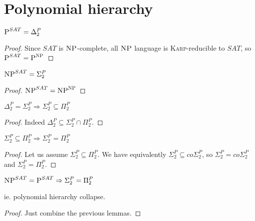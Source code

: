 \section{Polynomial hierarchy}

\begin{lemma}
    $\P^{SAT} = \Delta_2^P$
\end{lemma}
\begin{proof}
    Since $SAT$ is $\NP$-complete, all $\NP$ language is \textsc{Karp}-reducible to $SAT$, so $\P^{SAT} = \P^\NP$
\end{proof}

\begin{lemma}
    $\NP^{SAT} = \Sigma_2^P$
\end{lemma}
\begin{proof}
    $\NP^{SAT} = \NP^\NP$
\end{proof}

\begin{lemma}
    $\Delta_2^P = \Sigma_2^P \Rightarrow \Sigma_2^P \subseteq \Pi_2^P$
\end{lemma}
\begin{proof}
    Indeed $\Delta_2^P \subseteq \Sigma_2^P \cap \Pi_2^P$.
\end{proof}

\begin{lemma}
    $\Sigma_2^P \subseteq \Pi_2^P \Rightarrow \Sigma_2^P = \Pi_2^P$
\end{lemma}
\begin{proof}
    Let us assume $\Sigma_2^P \subseteq \Pi_2^P$. We have equivalently $\Sigma_2^P \subseteq co\Sigma_2^P$, so $\Sigma_2^P = co\Sigma_2^P$ and $\Sigma_2^P = \Pi_2^P$.
\end{proof}

\begin{thm}
    $\NP^{SAT}=\P^{SAT} \Rightarrow \Sigma_2^P = \Pi_2^P$
    
    ie. polynomial hierarchy collapse.
\end{thm}
\begin{proof}
    Just combine the previous lemmas.
\end{proof}


